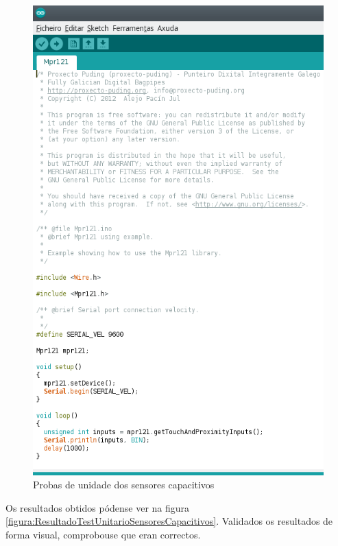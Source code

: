   \begin{figure}[htbp]
   \centering
   \includegraphics[scale=0.8,keepaspectratio=true]{./imagenes/test-sensores-capacitivos.png}
   \caption{Probas de unidade dos sensores capacitivos}
   \label{figura:TestUnitarioSensoresCapacitivos}
  \end{figure}
  
  Os resultados obtidos pódense ver na figura
  \ref{figura:ResultadoTestUnitarioSensoresCapacitivos}. Validados os resultados
  de forma visual, comprobouse que eran correctos. \\
  
